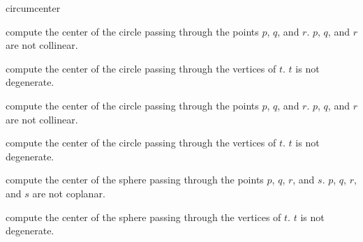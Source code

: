 \begin{ccRefFunction}{circumcenter}

 {compute the center of the circle passing through the points $p$, $q$, and $r$.
  \ccPrecond $p$, $q$, and $r$ are not collinear.}

 {compute the center of the circle passing through the vertices of $t$.
  \ccPrecond $t$ is not degenerate.}

 {compute the center of the circle passing through the points $p$, $q$, and $r$.
  \ccPrecond $p$, $q$, and $r$ are not collinear.}

 {compute the center of the circle passing through the vertices of $t$.
  \ccPrecond $t$ is not degenerate.}

 {compute the center of the sphere passing through the points $p$, $q$, $r$, and $s$.
  \ccPrecond $p$, $q$, $r$, and $s$ are not coplanar.}

 {compute the center of the sphere passing through the vertices of $t$.
  \ccPrecond $t$ is not degenerate.}

\end{ccRefFunction}

